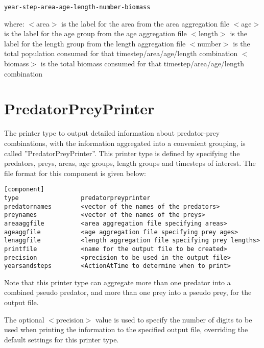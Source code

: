 \documentclass[10pt,twoside]{book}
\begin{document}
{\small\begin{verbatim}
year-step-area-age-length-number-biomass
\end{verbatim}}

where:\newline
$<$area$>$ is the label for the area from the area aggregation file\newline
$<$age$>$ is the label for the age group from the age aggregation file\newline
$<$length$>$ is the label for the length group from the length aggregation file\newline
$<$number$>$ is the total population consumed for that timestep/area/age/length combination\newline
$<$biomass$>$ is the total biomass consumed for that timestep/area/age/length combination

\section{PredatorPreyPrinter}\label{sec:predatorpreyprinter}
The printer type to output detailed information about predator-prey combinations, with the information aggregated into a convenient grouping, is called ''PredatorPreyPrinter''.  This printer type is defined by specifying the predators, preys, areas, age groups, length groups and timesteps of interest.  The file format for this component is given below:

{\small\begin{verbatim}
[component]
type                 predatorpreyprinter
predatornames        <vector of the names of the predators>
preynames            <vector of the names of the preys>
areaaggfile          <area aggregation file specifying areas>
ageaggfile           <age aggregation file specifying prey ages>
lenaggfile           <length aggregation file specifying prey lengths>
printfile            <name for the output file to be created>
precision            <precision to be used in the output file>
yearsandsteps        <ActionAtTime to determine when to print>
\end{verbatim}}

Note that this printer type can aggregate more than one predator into a combined pseudo predator, and more than one prey into a pseudo prey, for the output file.

\bigskip
The optional $<$precision$>$ value is used to specify the number of digits to be used when printing the information to the specified output file, overriding the default settings for this printer type.
\end{document}
